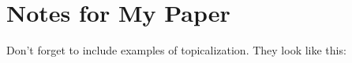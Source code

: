 \documentclass[12pt]{article}
\begin{document}
\section*{Notes for My Paper}

Don't forget to include examples of topicalization.
 They look like this:
\end{document}
